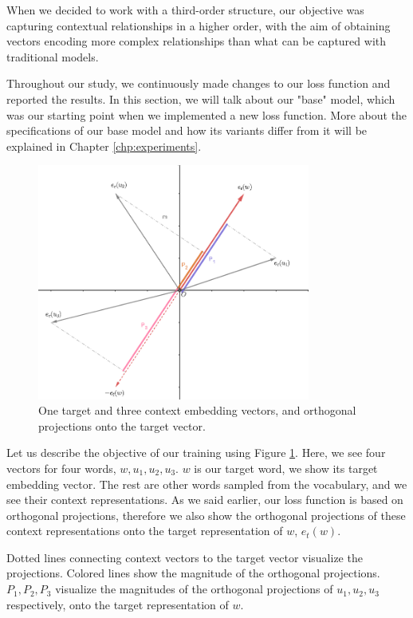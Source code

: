 When we decided to work with a third-order structure, our objective was capturing contextual relationships in a higher order, with the aim of obtaining vectors encoding more complex relationships than what can be captured with traditional models. 

Throughout our study, we continuously made changes to our loss function and reported the results. In this section, we will talk about our "base" model, which was our starting point when we implemented a new loss function. More about the specifications of our base model and how its variants differ from it will be explained in Chapter \ref{chp:experiments}.

\begin{figure}[ht]
    \centering
    \includegraphics[width=0.8\textwidth]{img/loss_plot.png}
    \caption{One target and three context embedding vectors, and orthogonal projections onto the target vector.}
    \label{fig:loss_plot}
\end{figure}

Let us describe the objective of our training using Figure \ref{fig:loss_plot}. Here, we see four vectors for four words, $w, u_1, u_2, u_3$. $w$ is our target word, we show its target embedding vector. The rest are other words sampled from the vocabulary, and we see their context representations. As we said earlier, our loss function is based on orthogonal projections, therefore we also show the orthogonal projections of these context representations onto the target representation of $w$, $e_t(w)$.

Dotted lines connecting context vectors to the target vector visualize the projections. Colored lines show the magnitude of the orthogonal projections. $P_1, P_2, P_3$ visualize the magnitudes of the orthogonal projections of $u_1, u_2 , u_3$ respectively, onto the target representation of $w$.

